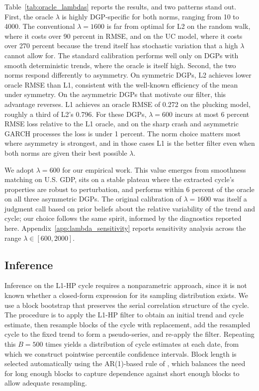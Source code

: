 \documentclass[10pt]{article}
\begin{document}
Table~\ref{tab:oracle_lambdas} reports the results, and two patterns stand out. First, the oracle $\lambda$ is highly DGP-specific for both norms, ranging from 10 to 4000. The conventional $\lambda = 1600$ is far from optimal for L2 on the random walk, where it costs over 90 percent in RMSE, and on the UC model, where it costs over 270 percent because the trend itself has stochastic variation that a high $\lambda$ cannot allow for. The standard calibration performs well only on DGPs with smooth deterministic trends, where the oracle is itself high. Second, the two norms respond differently to asymmetry. On symmetric DGPs, L2 achieves lower oracle RMSE than L1, consistent with the well-known efficiency of the mean under symmetry. On the asymmetric DGPs that motivate our filter, this advantage reverses. L1 achieves an oracle RMSE of 0.272 on the plucking model, roughly a third of L2's 0.796. For these DGPs, $\lambda = 600$ incurs at most 6 percent RMSE loss relative to the L1 oracle, and on the sharp crash and asymmetric GARCH processes the loss is under 1 percent. The norm choice matters most where asymmetry is strongest, and in those cases L1 is the better filter even when both norms are given their best possible $\lambda$.

We adopt $\lambda = 600$ for our empirical work. This value emerges from smoothness matching on U.S. GDP, sits on a stable plateau where the extracted cycle's properties are robust to perturbation, and performs within 6 percent of the oracle on all three asymmetric DGPs. The original \citet{hodrick_prescott1997} calibration of $\lambda = 1600$ was itself a judgment call based on prior beliefs about the relative variability of the trend and cycle; our choice follows the same spirit, informed by the diagnostics reported here. Appendix~\ref{app:lambda_sensitivity} reports sensitivity analysis across the range $\lambda \in [600, 2000]$.

\subsection{Inference}
\label{sec:inference}

Inference on the L1-HP cycle requires a nonparametric approach, since it is not known whether a closed-form expression for its sampling distribution exists. We use a block bootstrap \citep{kunsch1989} that preserves the serial correlation structure of the cycle. The procedure is to apply the L1-HP filter to obtain an initial trend and cycle estimate, then resample blocks of the cycle with replacement, add the resampled cycle to the fixed trend to form a pseudo-series, and re-apply the filter. Repeating this $B = 500$ times yields a distribution of cycle estimates at each date, from which we construct pointwise percentile confidence intervals. Block length is selected automatically using the AR(1)-based rule of \citet{politis_white2004}, which balances the need for long enough blocks to capture dependence against short enough blocks to allow adequate resampling.
\end{document}
